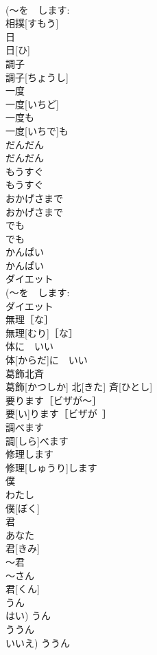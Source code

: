 \documentclass[8pt]{extreport}
\begin{document}
\begin{CJK}{UTF8}{min}
\\	(～を　します: 
\\	相撲[すもう]	
\\	日	
\\	日[ひ]	
\\	調子	
\\	調子[ちょうし]	
\\	一度	
\\	一度[いちど]	
\\	一度も	
\\	一度[いちで]も	
\\	だんだん	
\\	だんだん	
\\	もうすぐ	
\\	もうすぐ	
\\	おかげさまで	
\\	おかげさまで	
\\	でも	
\\	でも	
\\	かんぱい	
\\	かんぱい	
\\	ダイエット	
\\	(～を　します: 
\\	ダイエット	
\\	無理［な］	
\\	無理[むり]［な］	
\\	体に　いい	
\\	体[からだ]に　いい	
\\	葛飾北斉　
\\	葛飾[かつしか] 北[きた] 斉[ひとし]	
\\	要ります［ビザが～］	
\\	要[い]ります［ビザが~］	
\\	調べます	
\\	調[しら]べます	
\\	修理します	
\\	修理[しゅうり]します	
\\	僕	
\\	わたし 
\\	僕[ぼく]	
\\	君	
\\	あなた 
\\	君[きみ]	
\\	～君	
\\	～さん 
\\	君[くん]	
\\	うん	
\\	はい)	うん	
\\	ううん	
\\	いいえ)	ううん	

\end{CJK}
\end{document}

